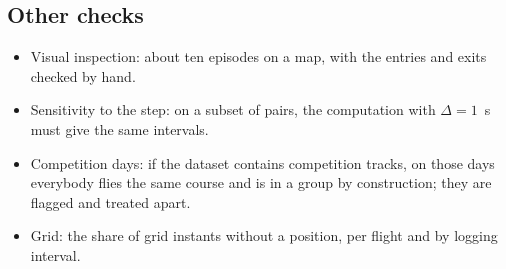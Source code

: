 \subsection{Other checks}\label{sec:checks}

\begin{itemize}
  \item Visual inspection: about ten episodes on a map, with the entries and exits checked by hand.
  \item Sensitivity to the step: on a subset of pairs, the computation with $\Delta=1$~s must give
        the same intervals.
  \item Competition days: if the dataset contains competition tracks, on those days everybody flies
        the same course and is in a group by construction; they are flagged and treated apart.
  \item Grid: the share of grid instants without a position, per flight and by logging interval.
\end{itemize}
